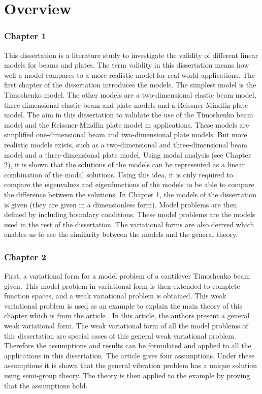 \documentclass[../main.tex]{subfiles}
\begin{document}
\section{Overview}

\subsubsection{Chapter 1}
This dissertation is a literature study to investigate the validity of different linear models for beams and plates. The term validity in this dissertation means how well a model compares to a more realistic model for real world applications. The first chapter of the dissertation introduces the models. The simplest model is the Timoshenko model. The other models are a two-dimensional elastic beam model, three-dimensional elastic beam and plate models and a Reissner-Mindlin plate model. The aim in this dissertation to validate the use of the Timoshenko beam model and the Reissner-Mindlin plate model in applications. These models are simplified one-dimensional beam and two-dimensional plate models. But more realistic models exists, such as a two-dimensional and three-dimensional beam model and a three-dimensional plate model. Using modal analysis (see Chapter 2), it is shown that the solutions of the models can be represented as a linear combination of the modal solutions. Using this idea, it is only required to compare the eigenvalues and eigenfunctions of the models to be able to compare the difference between the solutions. In Chapter 1, the models of the dissertation is given (they are given in a dimensionless form).  Model problems are then defined by including boundary conditions. These model problems are the models used in the rest of the dissertation. The variational forms are also derived which enables us to see the similarity between the models and the general theory.

\subsubsection{Chapter 2}
First, a variational form for a model problem of a cantilever Timoshenko beam given. This model problem in variational form is then extended to complete function spaces, and a weak variational problem is obtained. This weak variational problem is used as an example to explain the main theory of this chapter which is from the article \cite{VV02}. In this article, the authors present a general weak variational form. The weak variational form of all the model problems of this dissertation are special cases of this general weak variational problem. Therefore the assumptions and results can be formulated and applied to all the applications in this dissertation. The article gives four assumptions. Under these assumptions it is shown that the general vibration problem has a unique solution using semi-group theory. The theory is then applied to the example by proving that the assumptions hold.
\end{document}
